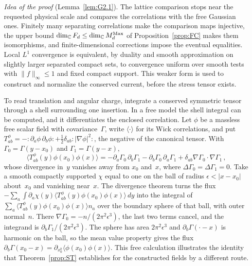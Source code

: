 \emph{Idea of the proof} (Lemma~\ref{lem:G2.1}). The lattice comparison stops near the requested physical scale and compares the correlations with the free Gaussian ones. Finitely many separating correlations make the comparison maps injective, the upper bound $\dim_{\mathbb{C}} F_d\le\dim_{\mathbb{C}}M_{d}^{\mathrm{Max}}$ of Proposition~\ref{prop:FC} makes them isomorphisms, and finite-dimensional corrections impose the eventual equalities. Local $L^1$ convergence is equivalent, by duality and smooth approximation on slightly larger separated compact sets, to convergence uniform over smooth tests with $\|f\|_\infty\le1$ and fixed compact support. This weaker form is used to construct and normalize the conserved current, before the stress tensor exists.

To read translation and angular charge, integrate a conserved symmetric tensor through a shell surrounding one insertion. In a free model the shell integral can be computed, and it differentiates the enclosed correlation. Let $\phi$ be a massless free scalar field with covariance~$\Gamma$, write $\langle\cdot\rangle$ for its Wick correlations, and put $T^\phi_{ab}=-{:}\partial_a\phi\,\partial_b\phi{:}+\frac12\delta_{ab}{:}|\nabla\phi|^2{:}$, the negative of the canonical tensor. With $\Gamma_0=\Gamma(y-x_0)$ and $\Gamma_1=\Gamma(y-x)$,
\begin{equation*}
\langle T^\phi_{ab}(y)\phi(x_0)\phi(x)\rangle=-\partial_a\Gamma_0\,\partial_b\Gamma_1-\partial_b\Gamma_0\,\partial_a\Gamma_1+\delta_{ab}\nabla\Gamma_0\cdot\nabla\Gamma_1\,,
\end{equation*}
whose divergence in~$y$ vanishes away from $x_0$ and~$x$, where $\Delta\Gamma_0=\Delta\Gamma_1=0$. Take a smooth compactly supported $\chi$ equal to one on the ball of radius $\epsilon<|x-x_0|$ about~$x_0$ and vanishing near~$x$. The divergence theorem turns the flux $-\sum_a\int\partial_a\chi(y)\langle T^\phi_{ab}(y)\phi(x_0)\phi(x)\rangle\,dy$ into the integral of $\sum_a\langle T^\phi_{ab}(y)\phi(x_0)\phi(x)\rangle n_a$ over the boundary sphere of that ball, with outer normal~$n$. There $\nabla\Gamma_0=-n/(2\pi^2\epsilon^3)$, the last two terms cancel, and the integrand is $\partial_b\Gamma_1/(2\pi^2\epsilon^3)$. The sphere has area $2\pi^2\epsilon^3$ and $\partial_b\Gamma(\cdot-x)$ is harmonic on the ball, so the mean value property gives the flux $\partial_b\Gamma(x_0-x)=\partial_{x_0^b}\langle\phi(x_0)\phi(x)\rangle$. This free calculation illustrates the identity that Theorem~\ref{prop:ST} establishes for the constructed fields by a different route.

